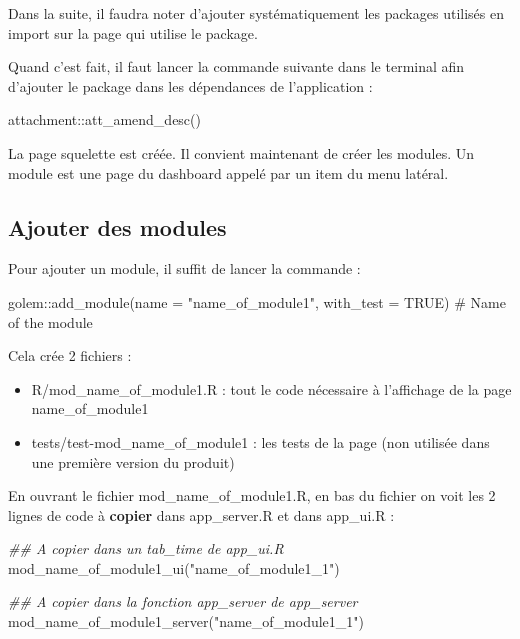 \documentclass[
  letterpaper,
  DIV=11,
  numbers=noendperiod]{scrreprt}
\newenvironment{Shaded}{\begin{snugshade}}{\end{snugshade}}
\newcommand{\AttributeTok}[1]{\textcolor[rgb]{0.40,0.45,0.13}{#1}}
\newcommand{\CommentTok}[1]{\textcolor[rgb]{0.37,0.37,0.37}{#1}}
\newcommand{\ConstantTok}[1]{\textcolor[rgb]{0.56,0.35,0.01}{#1}}
\newcommand{\DocumentationTok}[1]{\textcolor[rgb]{0.37,0.37,0.37}{\textit{#1}}}
\newcommand{\FunctionTok}[1]{\textcolor[rgb]{0.28,0.35,0.67}{#1}}
\newcommand{\NormalTok}[1]{\textcolor[rgb]{0.00,0.23,0.31}{#1}}
\newcommand{\SpecialCharTok}[1]{\textcolor[rgb]{0.37,0.37,0.37}{#1}}
\newcommand{\StringTok}[1]{\textcolor[rgb]{0.13,0.47,0.30}{#1}}
\providecommand{\tightlist}{%
  \setlength{\itemsep}{0pt}\setlength{\parskip}{0pt}}\usepackage{longtable,booktabs,array}
\begin{document}
Dans la suite, il faudra noter d'ajouter systématiquement les packages
utilisés en import sur la page qui utilise le package.

Quand c'est fait, il faut lancer la commande suivante dans le terminal
afin d'ajouter le package dans les dépendances de l'application :

\begin{Shaded}
\begin{Highlighting}[]
\NormalTok{attachment}\SpecialCharTok{::}\FunctionTok{att\_amend\_desc}\NormalTok{()}
\end{Highlighting}
\end{Shaded}

La page squelette est créée. Il convient maintenant de créer les
modules. Un module est une page du dashboard appelé par un item du menu
latéral.

\hypertarget{ajouter-des-modules}{%
\subsection{Ajouter des modules}\label{ajouter-des-modules}}

Pour ajouter un module, il suffit de lancer la commande :

\begin{Shaded}
\begin{Highlighting}[]
\NormalTok{golem}\SpecialCharTok{::}\FunctionTok{add\_module}\NormalTok{(}\AttributeTok{name =} \StringTok{"name\_of\_module1"}\NormalTok{, }\AttributeTok{with\_test =} \ConstantTok{TRUE}\NormalTok{) }\CommentTok{\# Name of the module}
\end{Highlighting}
\end{Shaded}

Cela crée 2 fichiers :

\begin{itemize}
\tightlist
\item
  R/mod\_name\_of\_module1.R : tout le code nécessaire à l'affichage de
  la page name\_of\_module1
\item
  tests/test-mod\_name\_of\_module1 : les tests de la page (non utilisée
  dans une première version du produit)
\end{itemize}

En ouvrant le fichier mod\_name\_of\_module1.R, en bas du fichier on
voit les 2 lignes de code à \textbf{copier} dans app\_server.R et dans
app\_ui.R :

\begin{Shaded}
\begin{Highlighting}[]
\DocumentationTok{\#\# A copier dans un tab\_time de app\_ui.R }
\FunctionTok{mod\_name\_of\_module1\_ui}\NormalTok{(}\StringTok{"name\_of\_module1\_1"}\NormalTok{)}
    
\DocumentationTok{\#\# A copier dans la fonction app\_server de app\_server }
\FunctionTok{mod\_name\_of\_module1\_server}\NormalTok{(}\StringTok{"name\_of\_module1\_1"}\NormalTok{)}
\end{Highlighting}
\end{Shaded}
\end{document}
